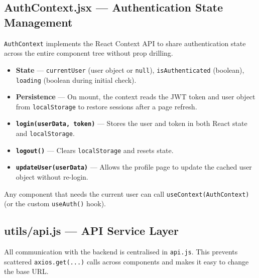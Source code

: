 \documentclass[12pt,a4paper]{report}
\begin{document}
\subsection{AuthContext.jsx --- Authentication State Management}

\texttt{AuthContext} implements the React Context API to share authentication state across the entire component tree without prop drilling.

\begin{itemize}[leftmargin=2em]
  \item \textbf{State} — \texttt{currentUser} (user object or \texttt{null}), \texttt{isAuthenticated} (boolean), \texttt{loading} (boolean during initial check).
  \item \textbf{Persistence} — On mount, the context reads the JWT token and user object from \texttt{localStorage} to restore sessions after a page refresh.
  \item \textbf{\texttt{login(userData, token)}} — Stores the user and token in both React state and \texttt{localStorage}.
  \item \textbf{\texttt{logout()}} — Clears \texttt{localStorage} and resets state.
  \item \textbf{\texttt{updateUser(userData)}} — Allows the profile page to update the cached user object without re-login.
\end{itemize}

Any component that needs the current user can call \texttt{useContext(AuthContext)} (or the custom \texttt{useAuth()} hook).

\subsection{utils/api.js --- API Service Layer}

All communication with the backend is centralised in \texttt{api.js}. This prevents scattered \texttt{axios.get(...)} calls across components and makes it easy to change the base URL.
\end{document}
